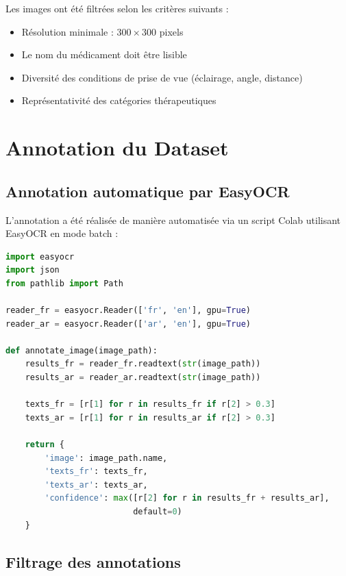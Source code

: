 \documentclass[12pt,a4paper]{report}
\begin{document}
Les images ont \'et\'e filtr\'ees selon les crit\`eres suivants :
\begin{itemize}
  \item R\'esolution minimale : $300 \times 300$ pixels
  \item Le nom du m\'edicament doit \^etre lisible
  \item Diversit\'e des conditions de prise de vue (\'eclairage, angle, distance)
  \item Repr\'esentativit\'e des cat\'egories th\'erapeutiques
\end{itemize}

\section{Annotation du Dataset}

\subsection{Annotation automatique par EasyOCR}

L'annotation a \'et\'e r\'ealis\'ee de mani\`ere automatis\'ee via un script Colab utilisant EasyOCR en mode batch :

\begin{codebox}
\begin{lstlisting}[language=Python]
import easyocr
import json
from pathlib import Path

reader_fr = easyocr.Reader(['fr', 'en'], gpu=True)
reader_ar = easyocr.Reader(['ar', 'en'], gpu=True)

def annotate_image(image_path):
    results_fr = reader_fr.readtext(str(image_path))
    results_ar = reader_ar.readtext(str(image_path))
    
    texts_fr = [r[1] for r in results_fr if r[2] > 0.3]
    texts_ar = [r[1] for r in results_ar if r[2] > 0.3]
    
    return {
        'image': image_path.name,
        'texts_fr': texts_fr,
        'texts_ar': texts_ar,
        'confidence': max([r[2] for r in results_fr + results_ar], 
                          default=0)
    }
\end{lstlisting}
\end{codebox}

\subsection{Filtrage des annotations}
\end{document}
